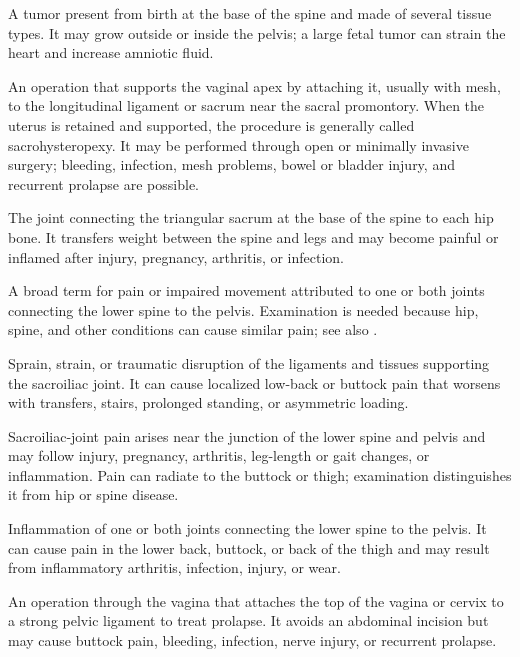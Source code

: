  A tumor present from birth at the base of the spine and made of several tissue types. It may grow outside or inside the pelvis; a large fetal tumor can strain the heart and increase amniotic fluid.

 An operation that supports the vaginal apex by attaching it, usually with mesh, to the longitudinal ligament or sacrum near the sacral promontory. When the uterus is retained and supported, the procedure is generally called sacrohysteropexy. It may be performed through open or minimally invasive surgery; bleeding, infection, mesh problems, bowel or bladder injury, and recurrent prolapse are possible.

 The joint connecting the triangular sacrum at the base of the spine to each hip bone. It transfers weight between the spine and legs and may become painful or inflamed after injury, pregnancy, arthritis, or infection.

 A broad term for pain or impaired movement attributed to one or both joints connecting the lower spine to the pelvis. Examination is needed because hip, spine, and other conditions can cause similar pain; see also .

 Sprain, strain, or traumatic disruption of the ligaments and tissues supporting the sacroiliac joint. It can cause localized low-back or buttock pain that worsens with transfers, stairs, prolonged standing, or asymmetric loading.

 Sacroiliac-joint pain arises near the junction of the lower spine and pelvis and may follow injury, pregnancy, arthritis, leg-length or gait changes, or inflammation. Pain can radiate to the buttock or thigh; examination distinguishes it from hip or spine disease.

 Inflammation of one or both joints connecting the lower spine to the pelvis. It can cause pain in the lower back, buttock, or back of the thigh and may result from inflammatory arthritis, infection, injury, or wear.

 An operation through the vagina that attaches the top of the vagina or cervix to a strong pelvic ligament to treat prolapse. It avoids an abdominal incision but may cause buttock pain, bleeding, infection, nerve injury, or recurrent prolapse.

